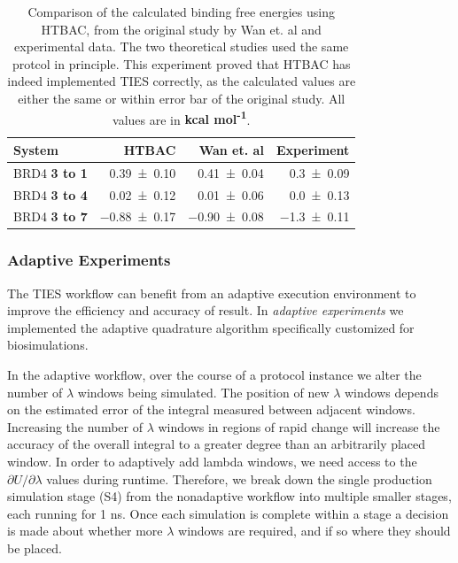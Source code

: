 \begin{table}
  \centering
  \begin{tabular}{l@{\hskip 1in}r@{\hskip 0.2in}r@{\hskip 0.2in}r}
    \toprule
    System & HTBAC & Wan et. al & Experiment \\
    \midrule
    BRD4 \textbf{3 to 1} & \num{0.39 +- 0.10} &   \num{0.41 +- 0.04} &  \num{0.3 +- 0.09} \\
    BRD4 \textbf{3 to 4} & \num{0.02 +- 0.12} &   \num{0.01 +- 0.06} &  \num{0.0 +- 0.13} \\
    BRD4 \textbf{3 to 7} & \num{-0.88 +- 0.17} &  \num{-0.90 +- 0.08} & \num{-1.3 +- 0.11} \\
    \bottomrule
  \end{tabular}
  \caption{Comparison of the calculated binding free energies using HTBAC,
  from the original study by Wan et. al and experimental data. The two
  theoretical studies used the same protcol in principle. This experiment
  proved that HTBAC has indeed implemented TIES correctly, as the calculated
  values are either the same or within error bar of the original study. All
  values are in \textbf{kcal mol\textsuperscript{-1}}.}
  \label{tab:exp2}
\end{table}

\subsubsection{Adaptive Experiments}

The TIES workflow can benefit from an adaptive execution environment to
improve the efficiency and accuracy of result. In \emph{adaptive experiments}
we implemented the adaptive quadrature algorithm specifically customized for
biosimulations.

In the adaptive workflow, over the course of a protocol instance we alter the
number of $\lambda$ windows being simulated. The position of new $\lambda$
windows depends on the estimated error of the integral measured between
adjacent windows. Increasing the number of $\lambda$ windows in regions of
rapid change will increase the accuracy of the overall integral to a greater
degree than an arbitrarily placed window. In order to adaptively add lambda
windows, we need access to the $\partial U/\partial\lambda$ values during
runtime. Therefore, we break down the single production simulation stage (S4)
from the nonadaptive workflow into multiple smaller stages, each running for
1 ns. Once each simulation is complete within a stage a decision is made
about whether more $\lambda$ windows are required, and if so where they
should be placed.

